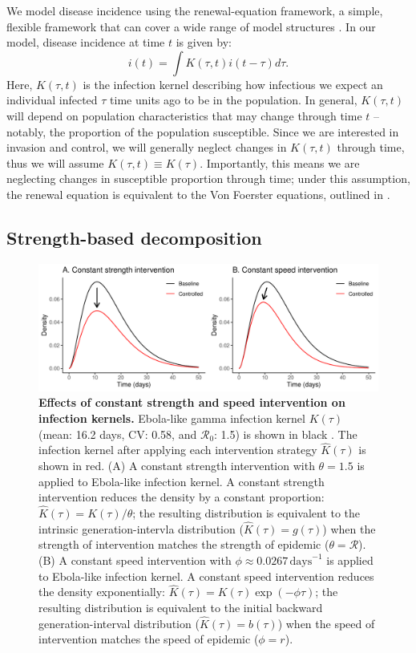 \documentclass[12pt]{article}\usepackage[]{graphicx}\usepackage[]{color}
\newcommand{\RR}{\ensuremath{{\mathcal R}}}
\newcommand{\figlab}[1]{\label{fig:#1}}
\begin{document}
We model disease incidence using the renewal-equation framework, a simple, flexible framework that can cover a wide range of model structures \citep{Champredon2018equivalence}.
In our model, disease incidence at time $t$ is given by:
\begin{equation}
i(t) = \int K(\tau, t) i(t-\tau) d\tau.
\end{equation}
Here, $K(\tau, t)$ is the infection kernel describing how infectious we expect an individual infected $\tau$ time units ago to be in the population.
In general, $K(\tau, t)$ will depend on population characteristics that may change through time $t$ -- notably, the proportion of the population susceptible.
Since we are interested in invasion and control, we will generally neglect changes in $K(\tau, t)$ through time, thus we will assume $K(\tau, t) \equiv K(\tau)$. 
Importantly, this means we are neglecting changes in susceptible proportion through time;
under this assumption, the renewal equation is equivalent to the Von Foerster equations, outlined in \cite{fraser2004factors}.

\subsection{Strength-based decomposition}

\begin{figure}[!t]
\includegraphics[width=\textwidth]{../figure/constant_intervention.pdf}
\caption{
\textbf{Effects of constant strength and speed intervention on infection kernels.}
Ebola-like gamma infection kernel $K(\tau)$ (mean: 16.2 days, CV: 0.58, and $\RR_0$: 1.5) is shown in black \citep{park2019practical}.
The infection kernel after applying each intervention strategy $\hat K(\tau)$ is shown in red.
(A) A constant strength intervention with $\theta = 1.5$ is applied to Ebola-like infection kernel.
A constant strength intervention reduces the density by a constant proportion: $\hat K(\tau) = K(\tau)/\theta$; the resulting distribution is equivalent to the intrinsic generation-intervla distribution ($\hat K(\tau) = g(\tau)$) when the strength of intervention matches the strength of epidemic ($\theta = \mathcal R$).
(B) A constant speed intervention with $\phi \approx 0.0267\,\mathrm{days}^{-1}$ is applied to Ebola-like infection kernel.
A constant speed intervention reduces the density exponentially: $\hat K(\tau) = K(\tau) \exp(-\phi \tau)$; the resulting distribution is equivalent to the initial backward generation-interval distribution ($\hat K(\tau) = b(\tau)$) when the speed of intervention matches the speed of epidemic ($\phi = r$).
}
\figlab{constant}
\end{figure}
\end{document}

